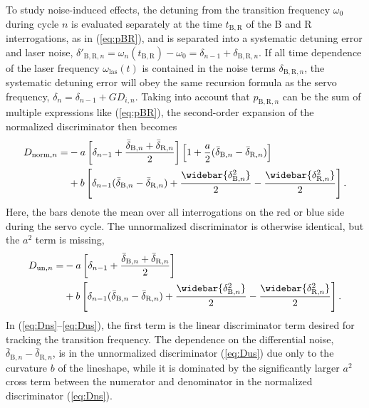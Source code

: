 \documentclass[10pt,a4paper]{iopart}
\newcommand{\eqref}[1]{(\ref{#1})}
\begin{document}
To study noise-induced effects, the detuning from the transition frequency $\omega_0$ during cycle $n$ is evaluated separately at the time $t_\mathrm{B,R}$ of the B and R interrogations, as in \eqref{eq:pBR}, and is separated into a systematic detuning error and laser noise, $\delta'_{\mathrm{B,R},n} = \omega_n(t_\mathrm{B,R}) -\omega_0 = \delta_{n-1} + \delta_{\mathrm{B,R},n}$. If all time dependence of the laser frequency $\omega_\mathrm{las}(t)$ is contained in the noise terms $\delta_{\mathrm{B,R},n}$, the systematic detuning error will obey the same recursion formula as the servo frequency, $\delta_{n} = \delta_{n-1} +  GD_{i,n}$.
Taking into account that $p_{\mathrm{B,R},n}$ can be the sum of multiple expressions like \eqref{eq:pBR}, the second-order expansion of the normalized discriminator then becomes
\begin{eqnarray}
D_{\mathrm{norm},n} = & -a \left[ \delta_{n-1} + \frac{\bar{\delta}_{\mathrm{B},n} + \bar{\delta}_{\mathrm{R},n}}{2} \right] \left[ 1 + \frac{a}{2} (\bar{\delta}_{\mathrm{B},n} -\bar{\delta}_{\mathrm{R},n}) \right] \nonumber \\
& +b \left[ \delta_{n-1} (\bar{\delta}_{\mathrm{B},n} -\bar{\delta}_{\mathrm{R},n})
+ \frac{\widebar{\delta_{\mathrm{B},n}^2}}{2} - \frac{\widebar{\delta_{\mathrm{R},n}^2}}{2} \right]. \label{eq:Dns}
\end{eqnarray}
Here, the bars denote the mean over all interrogations on the red or blue side during the servo cycle.
The unnormalized discriminator is otherwise identical, but the $a^2$ term is missing,
\begin{eqnarray}
D_{\mathrm{un},n} = & -a \left[ \delta_{n-1} + \frac{\bar{\delta}_{\mathrm{B},n} + \bar{\delta}_{\mathrm{R},n}}{2} \right]  \nonumber \\
& +b \left[ \delta_{n-1} (\bar{\delta}_{\mathrm{B},n} -\bar{\delta}_{\mathrm{R},n})
+ \frac{\widebar{\delta_{\mathrm{B},n}^2}}{2} - \frac{\widebar{\delta_{\mathrm{R},n}^2}}{2} \right]. \label{eq:Dus}
\end{eqnarray}
In (\ref{eq:Dns}--\ref{eq:Dus}), the first term is the linear discriminator term desired for tracking the transition frequency. The dependence on the differential noise, $\bar{\delta}_{\mathrm{B},n} -\bar{\delta}_{\mathrm{R},n}$, is in the unnormalized discriminator \eqref{eq:Dus} due only to the curvature $b$ of the lineshape, while it is dominated by the significantly larger $a^2$ cross term between the numerator and denominator in the normalized discriminator \eqref{eq:Dns}.
\end{document}
